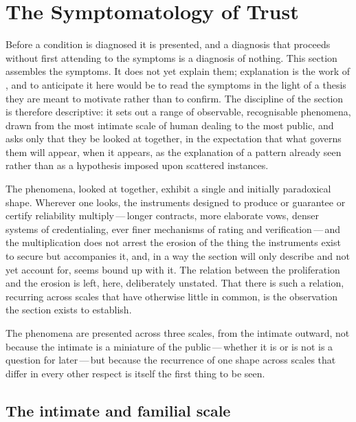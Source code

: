 \section{The Symptomatology of Trust}
\label{p13:sec:symptomatology}

\noindent
Before a condition is diagnosed it is presented, and a diagnosis that proceeds without first attending to the symptoms is a diagnosis of nothing. This section assembles the symptoms. It does not yet explain them; explanation is the work of , and to anticipate it here would be to read the symptoms in the light of a thesis they are meant to motivate rather than to confirm. The discipline of the section is therefore descriptive: it sets out a range of observable, recognisable phenomena, drawn from the most intimate scale of human dealing to the most public, and asks only that they be looked at together, in the expectation that what governs them will appear, when it appears, as the explanation of a pattern already seen rather than as a hypothesis imposed upon scattered instances.

The phenomena, looked at together, exhibit a single and initially paradoxical shape.  Wherever one looks, the instruments designed to produce or guarantee or certify reliability multiply\,---\,longer contracts, more elaborate vows, denser systems of credentialing, ever finer mechanisms of rating and verification\,---\,and the multiplication does not arrest the erosion of the thing the instruments exist to secure but accompanies it, and, in a way the section will only describe and not yet account for, seems bound up with it. The relation between the proliferation and the erosion is left, here, deliberately unstated. That there is such a relation, recurring across scales that have otherwise little in common, is the observation the section exists to establish.

The phenomena are presented across three scales, from the intimate outward, not because the intimate is a miniature of the public\,---\,whether it is or is not is a question for later\,---\,but because the recurrence of one shape across scales that differ in every other respect is itself the first thing to be seen.

\subsection{The intimate and familial scale}
\label{p13:sub:sympt-intimate}

